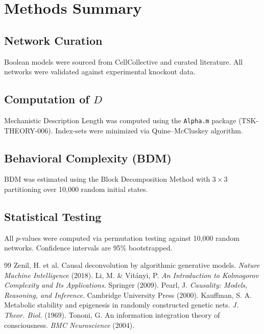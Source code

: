 \documentclass[10pt, twocolumn]{article}
\begin{document}
\section*{Methods Summary}

\subsection*{Network Curation}
Boolean models were sourced from CellCollective and curated literature. All networks were validated against experimental knockout data.

\subsection*{Computation of $D$}
Mechanistic Description Length was computed using the \texttt{Alpha.m} package (TSK-THEORY-006). Index-sets were minimized via Quine–McCluskey algorithm.

\subsection*{Behavioral Complexity (BDM)}
BDM was estimated using the Block Decomposition Method with $3 \times 3$ partitioning over 10,000 random initial states.

\subsection*{Statistical Testing}
All $p$-values were computed via permutation testing against 10,000 random networks. Confidence intervals are 95\% bootstrapped.

\begin{thebibliography}{99}
 Zenil, H. et al. Causal deconvolution by algorithmic generative models. \textit{Nature Machine Intelligence} (2018).
 Li, M. \& Vitányi, P. \textit{An Introduction to Kolmogorov Complexity and Its Applications}. Springer (2009).
 Pearl, J. \textit{Causality: Models, Reasoning, and Inference}. Cambridge University Press (2000).
 Kauffman, S. A. Metabolic stability and epigenesis in randomly constructed genetic nets. \textit{J. Theor. Biol.} (1969).
 Tononi, G. An information integration theory of consciousness. \textit{BMC Neuroscience} (2004).
\end{thebibliography}
\end{document}
